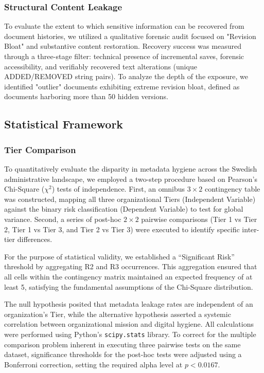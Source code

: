 \documentclass[conference]{IEEEtran}
\begin{document}
\subsubsection{Structural Content Leakage} 
To evaluate the extent to which sensitive information can be recovered from document histories, we utilized a qualitative forensic audit focused on "Revision Bloat" and substantive content restoration. Recovery success was measured through a three-stage filter: technical presence of incremental saves, forensic accessibility, and verifiably recovered text alterations (unique ADDED/REMOVED string pairs). To analyze the depth of the exposure, we identified "outlier" documents exhibiting extreme revision bloat, defined as documents harboring more than 50 hidden versions.

\subsection{Statistical Framework}

\subsubsection{Tier Comparison}
To quantitatively evaluate the disparity in metadata hygiene across the Swedish administrative landscape, we employed a two-step procedure based on Pearson's Chi-Square ($\chi^2$) tests of independence. First, an omnibus $3 \times 2$ contingency table was constructed, mapping all three organizational Tiers (Independent Variable) against the binary risk classification (Dependent Variable) to test for global variance. Second, a series of post-hoc $2 \times 2$ pairwise comparisons (Tier 1 vs Tier 2, Tier 1 vs Tier 3, and Tier 2 vs Tier 3) were executed to identify specific inter-tier differences.

For the purpose of statistical validity, we established a ``Significant Risk'' threshold by aggregating R2 and R3 occurrences. This aggregation ensured that all cells within the contingency matrix maintained an expected frequency of at least 5, satisfying the fundamental assumptions of the Chi-Square distribution.

The null hypothesis posited that metadata leakage rates are independent of an organization's Tier, while the alternative hypothesis asserted a systemic correlation between organizational mission and digital hygiene. All calculations were performed using Python's \texttt{scipy.stats} library. To correct for the multiple comparison problem inherent in executing three pairwise tests on the same dataset, significance thresholds for the post-hoc tests were adjusted using a Bonferroni correction, setting the required alpha level at $p < 0.0167$.
\end{document}
